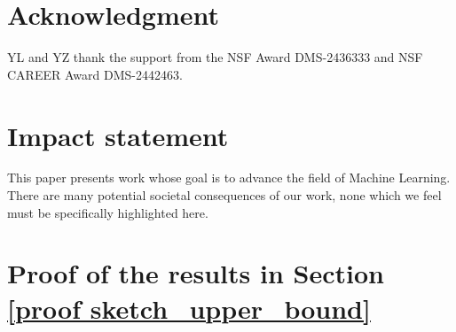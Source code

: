 \documentclass{article}
\theoremstyle{plain}
\theoremstyle{definition}
\theoremstyle{remark}
\begin{document}
\section*{Acknowledgment}
YL and YZ thank the support from the NSF Award DMS-2436333 and NSF CAREER Award DMS-2442463.
\section*{Impact statement}
This paper presents work whose goal is to advance the field of Machine
Learning. There are many potential societal consequences of our work, none
which we feel must be specifically highlighted here.





\newpage
\appendix
\onecolumn
\section{Proof of the results in Section \ref{proof sketch_upper_bound}} 
\end{document}
